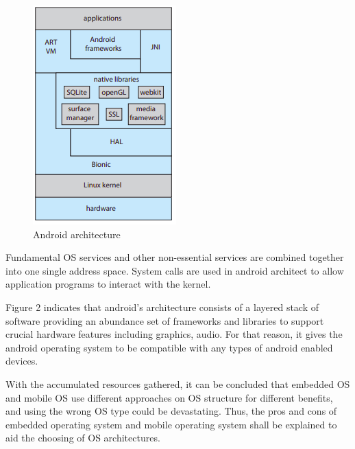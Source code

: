 \documentclass[conference]{IEEEtran}
\begin{document}
\begin{figure}[h]
  \caption{Android architecture}
\begin{center}
\includegraphics[scale=0.5]{./images/Android_architecture.png}
\end{center}
\end{figure}



Fundamental OS services and other non-essential services are combined together into one single address space\cite{Galvinbook}. System calls are used in android architect to allow application programs to interact with the kernel\cite{TDDBM}.

Figure 2 indicates that android’s architecture consists of a layered stack of software providing an abundance set of frameworks and libraries to support crucial hardware features including graphics, audio\cite{Galvinbook}. For that reason, it gives the android operating system to be compatible with any types of android enabled devices.

With the accumulated resources gathered, it can be concluded that embedded OS and mobile OS use different approaches on OS structure for different benefits, and using the wrong OS type could be devastating. Thus, the pros and cons of embedded operating system and mobile operating system shall be explained to aid the choosing of OS architectures.
\end{document}
